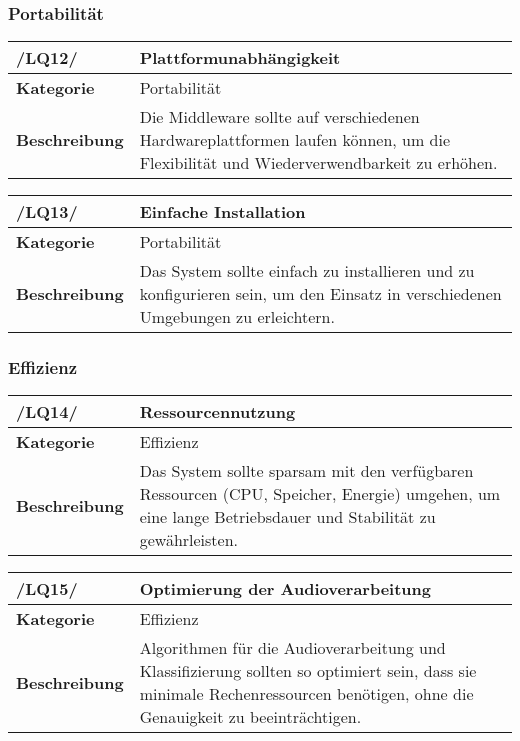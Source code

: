 \subsubsection{Portabilität}

\begin{table}[h!]
\begin{tabularx}{13cm}{|l|X|}
\hline
\textbf{/LQ12/} & \textbf{Plattformunabhängigkeit} \\ \hline
\textbf{Kategorie} & Portabilität \\ \hline
\textbf{Beschreibung} & Die Middleware sollte auf verschiedenen Hardwareplattformen laufen können, um die Flexibilität und Wiederverwendbarkeit zu erhöhen. \\ \hline
\end{tabularx}
\end{table}

\begin{table}[h!]
\begin{tabularx}{13cm}{|l|X|}
\hline
\textbf{/LQ13/} & \textbf{Einfache Installation} \\ \hline
\textbf{Kategorie} & Portabilität \\ \hline
\textbf{Beschreibung} & Das System sollte einfach zu installieren und zu konfigurieren sein, um den Einsatz in verschiedenen Umgebungen zu erleichtern. \\ \hline
\end{tabularx}
\end{table}

\subsubsection{Effizienz}

\begin{table}[h!]
\begin{tabularx}{13cm}{|l|X|}
\hline
\textbf{/LQ14/} & \textbf{Ressourcennutzung} \\ \hline
\textbf{Kategorie} & Effizienz \\ \hline
\textbf{Beschreibung} & Das System sollte sparsam mit den verfügbaren Ressourcen (CPU, Speicher, Energie) umgehen, um eine lange Betriebsdauer und Stabilität zu gewährleisten. \\ \hline
\end{tabularx}
\end{table}

\begin{table}[h!]
\begin{tabularx}{13cm}{|l|X|}
\hline
\textbf{/LQ15/} & \textbf{Optimierung der Audioverarbeitung} \\ \hline
\textbf{Kategorie} & Effizienz \\ \hline
\textbf{Beschreibung} & Algorithmen für die Audioverarbeitung und Klassifizierung sollten so optimiert sein, dass sie minimale Rechenressourcen benötigen, ohne die Genauigkeit zu beeinträchtigen. \\ \hline
\end{tabularx}
\end{table}

